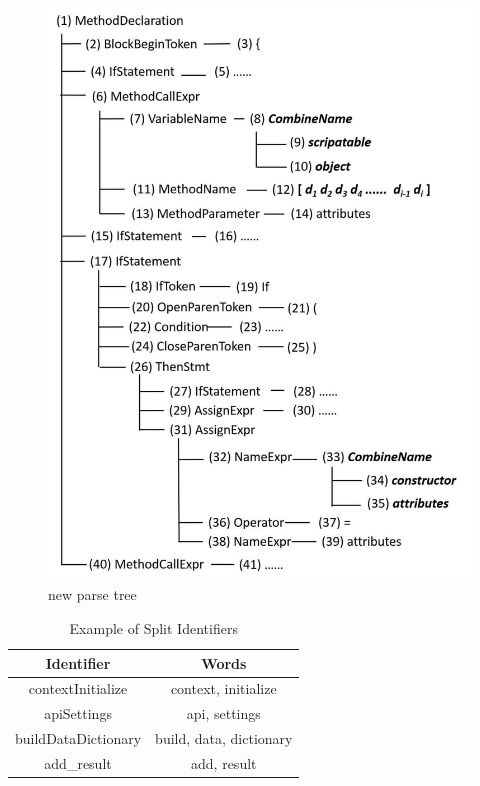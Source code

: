 \begin{figure}[!htp]
 \centering
 \includegraphics[width=\linewidth]{img/parseTree2.pdf}
 \caption{\label{figure:parseTree2} new parse tree}
\end{figure}


\begin{table}[!htp]
\centering
\caption{\label{table:splitID} Example of Split Identifiers}
\begin{tabular}{|c|c|}
\hline
Identifier & Words \\
\hline
contextInitialize & context, initialize\\
\hline
apiSettings & api, settings\\
\hline
buildDataDictionary & build, data, dictionary\\
\hline
add\_result & add, result\\
\hline
\end{tabular}

\end{table}

